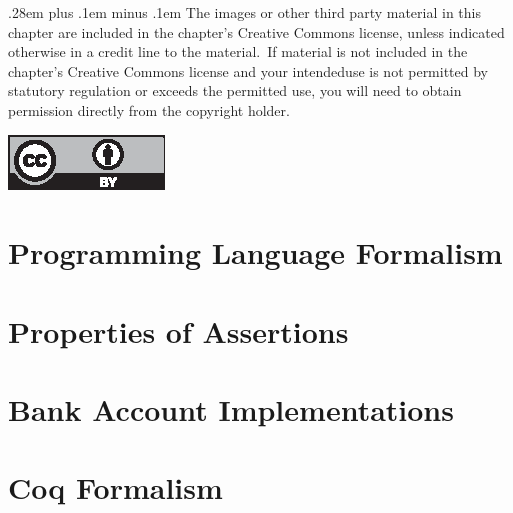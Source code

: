 \documentclass[acmsmall]{acmart}
\begin{document}
{\small \spaceskip .28em plus .1em minus .1em The images or other third party material in this chapter are included in the chapter's Creative Commons license, unless indicated otherwise in a credit line to the material.~If material is not included in the chapter's Creative Commons license and your intended\break use is not permitted by statutory regulation or exceeds the permitted use, you will need to obtain permission directly from the copyright holder.}

\medskip\noindent\includegraphics{cc_by_4-0.eps}

\newpage
\appendix

\section{Programming Language Formalism}
\label{app:LangOO}


\clearpage

\section{Properties of Assertions}
\label{app:assertions}


\clearpage

\section{Bank Account Implementations}
\label{Bank:appendix}


\clearpage

\section{Coq Formalism}
\label{sect:coq}


%   
%  
\end{document}
